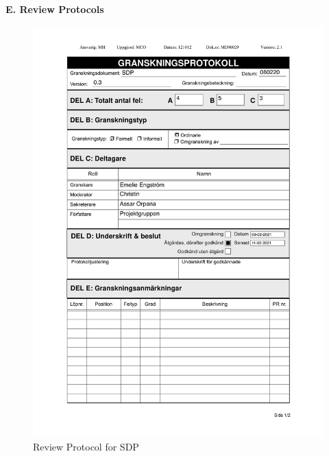 \documentclass{article}
\begin{document}
\newpage
\begin{flushleft}
{\large \textbf{E. Review Protocols}}
\end{flushleft}


\begin{figure}
     \centering
     \includegraphics[width=13cm]{images/SDP - Granskningsprotokoll-1}
     \renewcommand\figurename{Figure}
      \caption{Review Protocol for SDP}
     \label{fig:my_label}
 \end{figure}
  
\end{document}
